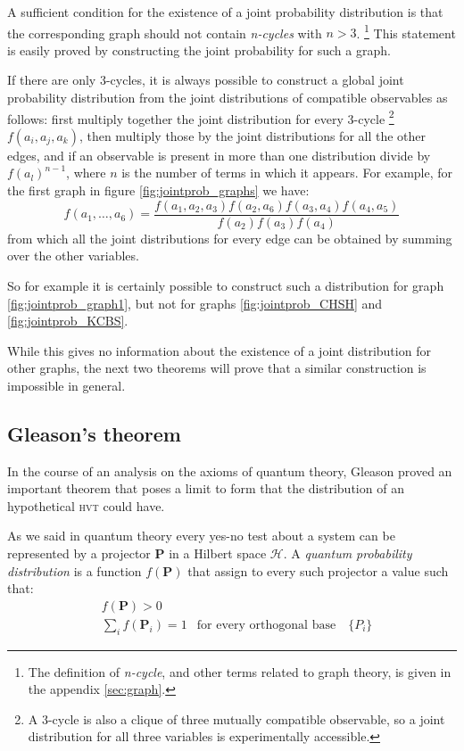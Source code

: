 \documentclass[a4paper]{article}
\newcommand{\Hil}{\mathcal{H}}
\newcommand{\op}[1]{\mathbf{#1}}
\newcommand{\acron}[1]{\textsc{#1}}
\newcommand{\HVT}{\acron{hvt}}
\theoremstyle{definition}
\let\oldproof\proof
\let\oldendproof\endproof
\renewenvironment{proof}
    {
        \begin{framed} 
        \oldproof
    }
    {
        \oldendproof 
        \end{framed}
    }
\begin{document}
A sufficient condition for the existence of a joint probability
distribution is that the corresponding graph should not contain \emph{n-cycles} with $n>3$.
\footnote{The definition of \emph{n-cycle}, and other terms related to graph
theory, is given in the appendix \ref{sec:graph}.}
This statement is easily proved by constructing the joint probability for such a
graph.
\begin{proof}
If there are only 3-cycles, it is always possible to construct a global joint
probability distribution from the joint distributions of compatible observables
as follows:
first multiply together the joint distribution for every 3-cycle 
\footnote{A 3-cycle is also a clique of three mutually compatible observable, so a
joint distribution for all three variables is experimentally accessible.}
$f(a_i, a_j,a_k)$, then multiply those by the joint distributions for all the other edges,
and if an observable is present in more than one distribution divide by
$f(a_l)^{n-1}$, where $n$ is the number of terms in which it appears.
For example, for the first graph in figure \ref{fig:jointprob_graphs} we have:
\begin{equation}
    f(a_1,\ldots,a_6) = \frac{f(a_1,a_2,a_3) f(a_2, a_6) f(a_3,a_4)
    f(a_4,a_5)}{f(a_2) f(a_3) f(a_4)}
    \label{eq:jointprob_graph1}
\end{equation}
from which all the joint distributions for every edge can be obtained by summing
over the other variables.
\end{proof}
So for example it is certainly possible to construct such a distribution for
graph \ref{fig:jointprob_graph1}, but not for graphs \ref{fig:jointprob_CHSH}
and \ref{fig:jointprob_KCBS}.

While this gives no information about the existence of a joint distribution for
other graphs, the next two theorems will prove that a
similar construction is impossible in general.

\subsection{Gleason's theorem}
In the course of an analysis on the axioms of quantum theory,
Gleason proved an important theorem that poses a limit to form that the
distribution of an hypothetical \HVT{} could have.

As we said in quantum theory every yes-no test about a system can be represented by a
projector $\op P$ in a Hilbert space $\Hil$.
A \emph{quantum probability distribution} is a function $f(\op P)$ that assign to every
such projector a value such that:
\begin{align}
    &f(\op P) > 0 \\
    &\sum_i f(\op P_i) = 1 & \text{for every orthogonal base} \quad \{P_i\}
    \label{eq:gleason_th_hypotesis}
\end{align}
\end{document}
